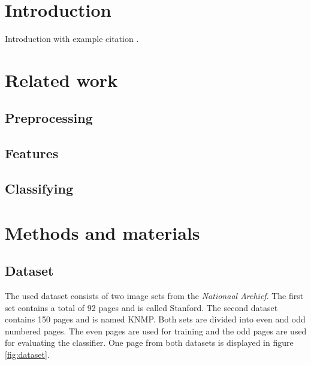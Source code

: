 \documentclass[11pt,a4paper]{article}
\begin{document}
\section{Introduction}
Introduction with example citation \cite{KNUT1984}.

\section{Related work}
\subsection{Preprocessing}
\subsection{Features}
\subsection{Classifying}
\section{Methods and materials}
\subsection{Dataset}
The used dataset consists of two image sets from the \emph{Nationaal Archief}. The first set contains a total of 92 pages and is called Stanford. The second dataset contains 150 pages and is named KNMP. Both sets are divided into even and odd numbered pages. The even pages are used for training and the odd pages are used for evaluating the classifier. One page from both datasets is displayed in figure \ref{fig:dataset}. 
\end{document}
